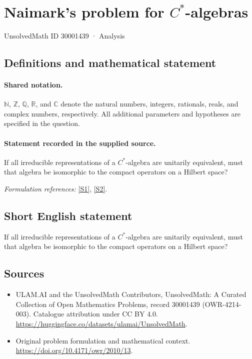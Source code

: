 \documentclass[11pt]{article}
\newcommand{\sref}[2]{\hyperlink{source:#1:#2}{[S#2]}}
\begin{document}
\setcounter{section}{30001438}
\section{\texorpdfstring{Naimark's problem for $C^*$-algebras}{Naimark's problem for C\textasciicircum{}*-algebras}}\label{30001439}
{\small UnsolvedMath ID 30001439 · Analysis}
\subsection{Definitions and mathematical statement}

\paragraph{Shared notation.}$\mathbb N$, $\mathbb Z$, $\mathbb Q$, $\mathbb R$, and $\mathbb C$ denote the natural numbers, integers, rationals, reals, and complex numbers, respectively. All additional parameters and hypotheses are specified in the question.


\paragraph{Statement recorded in the supplied source.}
If all irreducible representations of a $C^*$-algebra are unitarily equivalent, must that algebra be isomorphic to the compact operators on a Hilbert space?
\par\smallskip\textit{Formulation references:} \sref{30001439}{1}, \sref{30001439}{2}.
\subsection{Short English statement}
If all irreducible representations of a $C^*$-algebra are unitarily equivalent, must that algebra be isomorphic to the compact operators on a Hilbert space?
\subsection{Sources}
\begin{itemize}
\item[\hypertarget{source:30001439:1}{S1}] ULAM.AI and the UnsolvedMath Contributors, UnsolvedMath: A Curated Collection of Open Mathematics Problems, record 30001439 (OWR-4214-003). Catalogue attribution under CC BY 4.0.
\url{https://huggingface.co/datasets/ulamai/UnsolvedMath}.
\item[\hypertarget{source:30001439:2}{S2}] Original problem formulation and mathematical context.
\url{https://doi.org/10.4171/owr/2010/13}.
\end{itemize}
\label{end:30001439}
\end{document}
